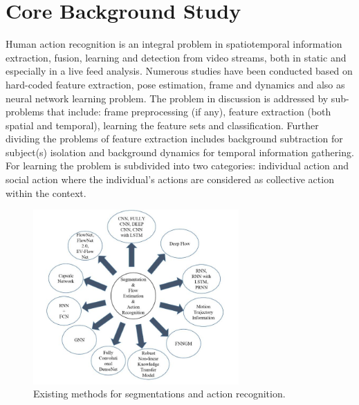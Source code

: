 \documentclass[11pt,english]{article}
\begin{document}
\section{Core Background Study}
Human action recognition is an integral problem in spatiotemporal information extraction, fusion, learning and detection from video streams, both in static and especially in a live feed analysis. Numerous studies have been conducted based on hard-coded feature extraction, pose estimation, frame and dynamics and also as neural network learning problem. The problem in discussion is addressed by sub-problems that include: frame preprocessing (if any), feature extraction (both spatial and temporal), learning the feature sets and classification. Further dividing the problems of feature extraction includes background subtraction for subject(s) isolation and background dynamics for temporal information gathering. For learning the problem is subdivided into two categories: individual action and social action where the individual's actions are considered as collective action within the context.

 \begin{figure}
\centering
\includegraphics[width=0.7\textwidth]{methods.JPG}
\caption{\label{fig:method}Existing methods for segmentations and action recognition.}
\end{figure}
\end{document}
